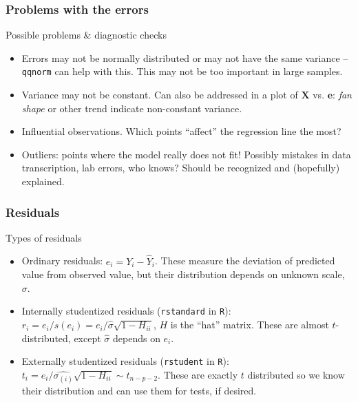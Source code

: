 \documentclass[handout]{beamer}
\begin{document}

   \begin{frame} \frametitle{Problems with the errors}

   \begin{block}
   {Possible problems \& diagnostic checks}
   \begin{itemize}[<+->]

   \item
   Errors may not be normally distributed or may not have  the same
   variance -- {\tt qqnorm} can help with this. This may not
   be too important in large samples.

   \item Variance may not be constant. Can also be addressed in a plot of
   $\pmb{X}$ vs. $\pmb{e}$: {\em fan shape} or other trend indicate
   non-constant variance.


   \item Influential observations. Which points ``affect'' the regression line the most?

   \item Outliers: points where the model really does not fit! Possibly mistakes in data transcription, lab errors, who knows? Should be recognized and (hopefully) explained.

   \end{itemize}
   \end{block}
   \end{frame}


   \begin{frame} \frametitle{Residuals}

   \begin{block}
   {Types of residuals}
   \begin{itemize}[<+->]
   \item Ordinary residuals: $e_i = Y_i - \widehat{Y}_i$. These measure the deviation of predicted value from observed value, but their distribution depends on unknown scale, $\sigma$.
   \item Internally studentized residuals ({\tt rstandard} in {\tt R}): $r_i = e_i / s(e_i) = e_i / \widehat{\sigma} \sqrt{1 - H_{ii}}$, $H$ is the ``hat'' matrix. These are almost $t$-distributed, except $\widehat{\sigma}$ depends on $e_i$.
   \item Externally studentized residuals ({\tt rstudent} in {\tt R}): $t_i = e_i / \widehat{\sigma_{(i)}} \sqrt{1 - H_{ii}} \sim t_{n-p-2}.$ These are
   exactly $t$ distributed so we know their distribution and can use them for tests, if desired.
   \end{itemize}
   \end{block}
   \end{frame}
\end{document}
